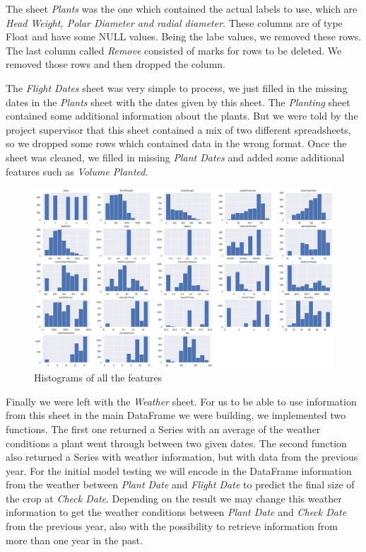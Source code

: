 \documentclass{article}
\begin{document}
The sheet \emph{Plants} was the one which contained the actual labels to use,
which are \emph{Head Weight, Polar Diameter and radial diameter}. These columns are of type Float and have
some NULL values. Being the labe values, we removed these rows. The last column called \emph{Remove} consisted
of marks for rows to be deleted. We removed those rows and then dropped the column.

The \emph{Flight Dates} sheet was very simple to process, we just filled in the missing dates in the \emph{Plants}
sheet with the dates given by this sheet. The \emph{Planting} sheet contained some additional information
about the plants. But we were told by the project supervisor that this sheet contained a mix of two different
spreadsheets, so we dropped some rows which contained data in the wrong format. Once the sheet was cleaned,
we filled in missing \emph{Plant Dates} and added some additional features such as \emph{Volume Planted}.

\begin{figure}[h]
    \centering
    \includegraphics[width=\textwidth]{hist.png}
    \caption{Histograms of all the features}
    \label{figure:1}
\end{figure}

Finally we were left with the \emph{Weather} sheet. For us to be able to use information from this sheet in
the main DataFrame we were building, we implemented two functions. The first one returned a Series with an
average of the weather conditions a plant went through between two given dates. The second function also returned
a Series with weather information, but with data from the previous year. For the initial model testing we will
encode in the DataFrame information from the weather between \emph{Plant Date} and \emph{Flight Date} to predict
the final size of the crop at \emph{Check Date}. Depending on the result we may change this weather information
to get the weather conditions between \emph{Plant Date} and \emph{Check Date} from the previous year, also
with the possibility to retrieve information from more than one year in the past.
\end{document}
